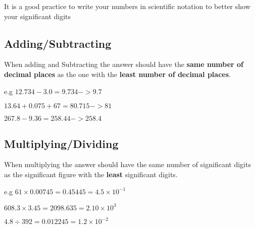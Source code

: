 \documentclass[12pt]{article}
\newcommand{\sn}[2]{#1\times10^{#2}}
\begin{document}
It is a good practice to write your numbers in scientific notation to better show your significant digits

\subsection{Adding/Subtracting}
When adding and Subtracting the answer should have the \textbf{same number of decimal places} as the one with the \textbf{least number of decimal places}.

e.g $12.734-3.0=9.734->9.7$

$13.64 + 0.075 + 67=80.715->81$

$267.8 - 9.36=258.44->258.4$
\subsection{Multiplying/Dividing}
When multiplying the answer should have the same number of significant digits as the significant figure with the \textbf{least} significant digits.

e.g $61\times0.00745=0.45445=\sn{4.5}{-1}$

$608.3\times3.45=2098.635=\sn{2.10}{3}$

$4.8\div392=0.012245=\sn{1.2}{-2}$
\end{document}
